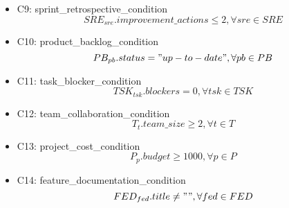 \documentclass{article}
\begin{document}
\begin{itemize}
\begin{equation*}
        \end{equation*}
    \item C9: sprint\_retrospective\_condition
        \begin{equation*}
            SRE_{sre}.improvement\_actions \leq 2, \forall sre \in SRE
        \end{equation*}
    \item C10: product\_backlog\_condition
        \begin{equation*}
            PB_{pb}.status = "up-to-date", \forall pb \in PB
        \end{equation*}
    \item C11: task\_blocker\_condition
        \begin{equation*}
            TSK_{tsk}.blockers = 0, \forall tsk \in TSK
        \end{equation*}
    \item C12: team\_collaboration\_condition
        \begin{equation*}
            T_{t}.team\_size \geq 2, \forall t \in T
        \end{equation*}
    \item C13: project\_cost\_condition
        \begin{equation*}
            P_{p}.budget \geq 1000, \forall p \in P
        \end{equation*}
    \item C14: feature\_documentation\_condition
        \begin{equation*}
            FED_{fed}.title \neq "", \forall fed \in FED
        \end{equation*}
\end{itemize}
\end{document}
